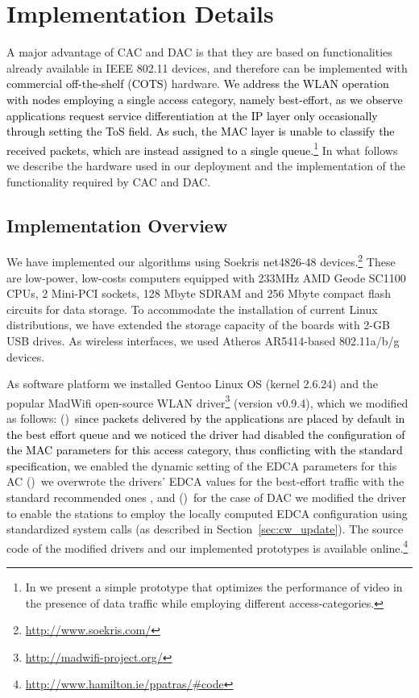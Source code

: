\documentclass[a4paper,10pt]{article}
\newcommand{\revs}[1]{\textcolor{black}{#1}}
\begin{document}
\section{Implementation Details}
\label{sec:implementation}

A major advantage of CAC and DAC is that they are based on functionalities already available in IEEE 802.11 devices, and therefore can be implemented with \revs{commercial off-the-shelf (COTS)} hardware. \revs{We address the WLAN operation with nodes employing a single access category, namely best-effort, as we observe applications request service differentiation at the IP layer only occasionally through setting the ToS field. As such, the MAC layer is unable to classify the received packets, which are instead assigned to a single queue.\footnote{In \cite{tomccap} we present a simple prototype that optimizes the performance of video in the presence of data traffic while employing different access-categories.}} In what follows we describe the hardware used in our deployment and the implementation of the functionality required by CAC and DAC. 

\subsection{Implementation Overview}
We have implemented our algorithms using Soekris net4826-48 devices.\footnote{{\ttfamily \url{http://www.soekris.com/}}} These are low-power, low-costs computers equipped with 233MHz AMD Geode SC1100 CPUs, 2 Mini-PCI sockets, 128 Mbyte SDRAM and 256 Mbyte compact flash circuits for data storage. To accommodate the installation of current Linux distributions, we have extended the storage capacity of the boards with 2-GB USB drives. As wireless interfaces, we used Atheros AR5414-based 802.11a/b/g devices. 


As software platform we installed Gentoo Linux OS (kernel 2.6.24) and the popular MadWifi open-source WLAN driver\footnote{\url{http://madwifi-project.org/}} (version v0.9.4), which we modified as follows: ()~\revs{since packets delivered by the applications are placed by default in the best effort queue and we noticed the driver had disabled the configuration of the MAC parameters for this access category, thus conflicting with the standard specification,} we enabled the dynamic setting of the EDCA parameters for this AC ()~we overwrote the drivers' EDCA values for the best-effort traffic with the standard recommended ones \cite{80211revised}, and ()~for the case of DAC we modified the driver to enable the stations to employ the locally computed EDCA configuration using standardized system calls (as described in Section~\ref{sec:cw_update}). The source code of the modified drivers and our implemented prototypes is available online.\footnote{\url{http://www.hamilton.ie/ppatras/#code}}
\end{document}
